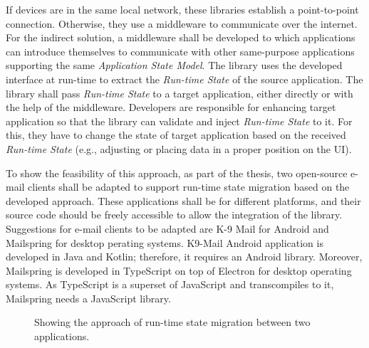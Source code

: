If devices are in the same local network, these libraries establish a point-to-point connection. Otherwise, they use a middleware to communicate over the internet.
For the indirect solution, a middleware shall be developed to which applications can introduce themselves to communicate with other same-purpose applications supporting the same \textit{Application State Model}. 
The library uses the developed interface at run-time to extract the \textit{Run-time State} of the source application. The library shall pass \textit{Run-time State} to a target application, either directly or with the help of the middleware. 
Developers are responsible for enhancing target application so that the library can validate and inject \textit{Run-time State} to it. 
For this, they have to change the state of target application based on the received \textit{Run-time State} (e.g., adjusting or placing data in a proper position on the UI). 

To show the feasibility of this approach, as part of the thesis, two open-source e-mail clients shall be adapted to support run-time state migration based on the developed approach. These applications shall be for different platforms, and their source code should be freely accessible to allow the integration of the library.
Suggestions for e-mail clients to be adapted are K-9 Mail for Android and Mailspring for desktop perating systems.
K9-Mail Android application is developed in Java and Kotlin; therefore, it requires an Android library. Moreover, Mailspring is developed in TypeScript on top of Electron for desktop operating systems. As TypeScript is a superset of JavaScript and transcompiles to it\cite{typescript}, Mailspring needs a JavaScript library.

\FloatBarrier
\begin{figure}[!b]
    
    \caption{Showing the approach of run-time state migration between two applications.}
    \label{fig:solution}
\end{figure}
\FloatBarrier
